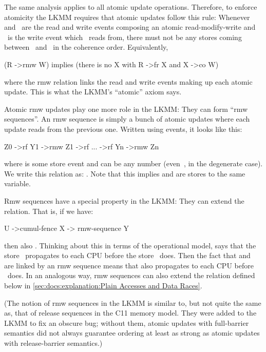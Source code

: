 The same analysis applies to all atomic update operations.
Therefore, to enforce atomicity the LKMM requires that atomic
updates follow this rule:
Whenever  and~ are the read and write events composing an
atomic read-modify-write and ~is the write event which ~reads from,
there must not be any stores coming between~ and~ in the coherence
order.
Equivalently,

\begin{VerbatimU}
	(R ->rmw W) implies (there is no X with R ->fr X and X ->co W)
\end{VerbatimU}

\noindent%
where the rmw relation links the read and write events making up each
atomic update.
This is what the LKMM's ``atomic'' axiom says.

Atomic rmw updates play one more role in the LKMM\@:
They can form ``rmw sequences''.
An rmw sequence is simply a bunch of atomic updates where
each update reads from the previous one.
Written using events, it looks like this:

\begin{VerbatimU}
	Z0 ->rf Y1 ->rmw Z1 ->rf ... ->rf Yn ->rmw Zn
\end{VerbatimU}

\noindent%
where  is some store event and  can be any number (even~, in the
degenerate case).
We write this relation as{:} .
Note that this implies  and  are stores to the same variable.

Rmw sequences have a special property in the LKMM\@:
They can extend the  relation.
That is, if we have:

\begin{VerbatimU}
	U ->cumul-fence X -> rmw-sequence Y
\end{VerbatimU}

\noindent%
then also .  Thinking about this in terms of the
operational model,  says that the store~ propagates
to each CPU before the store~ does.
Then the fact that  and~ are linked by an rmw sequence
means that  also propagates to each CPU before ~does.
In an analogous way, rmw sequences can also extend the
 relation defined below
in \cref{sec:docs:explanation:Plain Accesses and Data Races}.

(The notion of rmw sequences in the LKMM is similar to, but not quite
the same as, that of release sequences in the C11 memory model.
They were added to the LKMM to fix an obscure bug; without them, atomic
updates with full-barrier semantics did not always guarantee ordering
at least as strong as atomic updates with release-barrier semantics.)


